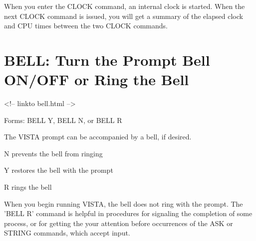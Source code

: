 When you enter the CLOCK command, an internal clock is started. When the
next CLOCK command is issued, you will get a summary of the elapsed clock
and CPU times between the two CLOCK commands.

\section{BELL: Turn the Prompt Bell ON/OFF or Ring the Bell }
\begin{rawhtml}
<!-- linkto bell.html -->
\end{rawhtml}
\begin{command}
  \item[Forms: BELL Y, BELL N, or BELL R\hfill]{}
\end{command}

The VISTA prompt can be accompanied by a bell, if desired.
\begin{example}
  \item[N\hfill]{prevents the bell from ringing}
  \item[Y\hfill]{restores the bell with the prompt}
  \item[R\hfill]{rings the bell}
\end{example}
When you begin running VISTA, the bell does not ring with the prompt. The
'BELL R' command is helpful in procedures for signaling the completion of
some process, or for getting the your attention before occurrences of the
ASK or STRING commands, which accept input.

